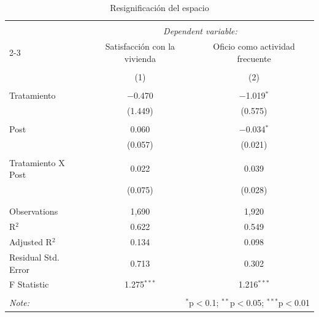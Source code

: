 
\begin{table}[H] \centering 
  \caption{Resignificación del espacio} 
  \label{reg_resignification} 
\tiny 
\begin{tabular}{@{\extracolsep{-7pt}}lcc} 
\\[-1.8ex]\hline 
\hline \\[-1.8ex] 
 & \multicolumn{2}{c}{\textit{Dependent variable:}} \\ 
\cline{2-3} 
 & Satisfacción con la vivienda & Oficio como actividad frecuente \\ 
\\[-1.8ex] & (1) & (2)\\ 
\hline \\[-1.8ex] 
 Tratamiento & $-$0.470 & $-$1.019$^{*}$ \\ 
  & (1.449) & (0.575) \\ 
  & & \\ 
 Post & 0.060 & $-$0.034$^{*}$ \\ 
  & (0.057) & (0.021) \\ 
  & & \\ 
 Tratamiento X Post & 0.022 & 0.039 \\ 
  & (0.075) & (0.028) \\ 
  & & \\ 
\hline \\[-1.8ex] 
Observations & 1,690 & 1,920 \\ 
R$^{2}$ & 0.622 & 0.549 \\ 
Adjusted R$^{2}$ & 0.134 & 0.098 \\ 
Residual Std. Error & 0.713 & 0.302 \\ 
F Statistic & 1.275$^{***}$ & 1.216$^{***}$ \\ 
\hline 
\hline \\[-1.8ex] 
\textit{Note:}  & \multicolumn{2}{r}{$^{*}$p$<$0.1; $^{**}$p$<$0.05; $^{***}$p$<$0.01} \\ 
\end{tabular} 
\end{table} 
